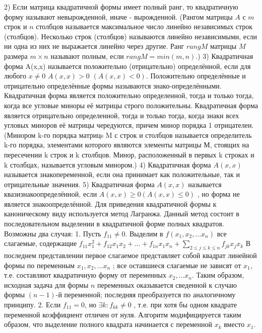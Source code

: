 \documentclass[a4paper,14pt]{report}
\newcommand\tab[1][1cm]{\hspace*{#1}}
\newcommand{\dsum}[2]{\sum\limits_{#1}{#2}}
\newcommand{\tl}{\newline\tab}
\begin{document}
\tl
2) Если матрица квадратичной формы имеет полный ранг, то квадратичную форму называют невырожденной, иначе - вырожденной.
\tl
(Рангом матрицы $A$ с $m$ строк и $n$ столбцов называется максимальное число линейно независимых строк (столбцов). Несколько строк (столбцов) называются линейно независимыми, если ни одна из них не выражается линейно через другие. Ранг $rangM$ матрицы $M$ размера $m \times n$ называют полным, если $rangM = min(m,n)$.)
\tl
3) Квадратичная форма A(x,x) называется положительно (отрицательно) определённой, если для любого $x \ne 0$ $A(x,x)> 0$ $(A(x,x)<0)$. Положительно определённые и отрицательно определённые формы называются знако-определёнными. 
\tl
Квадратичная форма является положительно определенной, тогда и только тогда, когда все угловые миноры её матрицы строго положительны.
\tl
Квадратичная форма является отрицательно определенной, тогда и только тогда, когда знаки всех угловых миноров её матрицы чередуются, причем минор порядка 1 отрицателен.
\tl
(Минором k-го порядка матрицs M с  строк и  столбцов называется определитель k-го порядка, элементами которого являются элементы матрицы М, стоящих на пересечении k строк и k столбцов. 
Минор, расположенный в первых k строках и k столбцах, называется угловым минором.)
\tl
4) Квадратичная форма $A(x,x)$ называется знакопеременной, если она принимает как положительные, так и отрицательные значения.
\tl
5) Квадратичная форма $A(x,x)$ называется квазизнакоопределённой, если  $A(x,x) \ge 0 (A(x,x) \le 0)$ , но форма не является знакоопределённой.
\tl
Для приведения квадратичной формы к каноническому виду используется метод Лагранжа. Данный метод состоит в последовательном выделении в квадратичной форме полных квадратов. Возможны два случая:
\tl
1. Пусть $f_{11} \ne 0$. Выделим в $f(x_1,x_2,...x_n)$ все слагаемые, содержащие 
$f_{11}x_{1}^{2}+f_{12}x_{1}x_{2}+...+f_{1n}x_{1}x_{n}+\dsum{2 \le j \le k \le n}{f_{jk}x_{j}x_{k}}$
\tl
В последнем представлении первое слагаемое представляет собой квадрат линейной формы по переменным $x_1,x_2,...x_n$ ; все оставшиеся слагаемые не зависят от $x_1$, т.е. составляют квадратичную форму от переменных $x_2,...x_n$. Таким образом, исходная задача для формы $n$ переменных оказывается сведенной к случаю формы $(n-1)$-й переменной; последняя преобразуется по аналогичному принципу.
\tl
2. Если $f_{11}=0$, но $\exists k: f_{kk} \ne 0$ , т.е. при хотя бы одном квадрате переменной коэффициент отличен от нуля. Алгоритм модифицируется таким образом, что выделение полного квадрата начинается с переменной $x_{k}$ вместо $x_{1}$.
\end{document}
